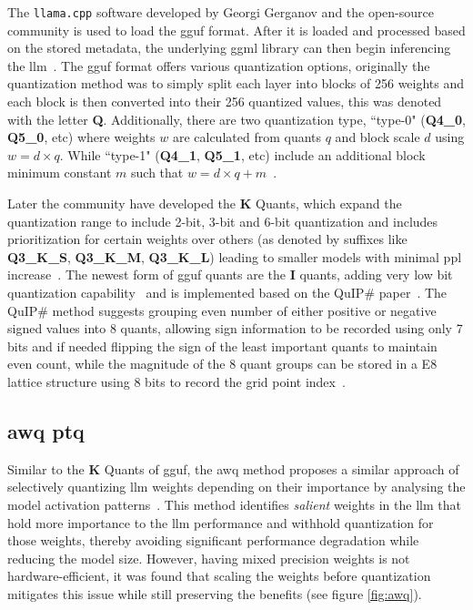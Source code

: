 \documentclass{ifacconf}
\begin{document}
	The \texttt{llama.cpp} software developed by Georgi Gerganov and the open-source community is used to load the \gls{gguf} format. After it is loaded and processed based on the stored metadata, the underlying \gls{ggml} library can then begin inferencing the \gls{llm}~\cite{ggufgithub}. The \gls{gguf} format offers various quantization options, originally the quantization method was to simply split each layer into blocks of 256 weights and each block is then converted into their 256 quantized values, this was denoted with the letter \textbf{Q}. Additionally, there are two quantization type, ``type-0" (\textbf{Q4\_0}, \textbf{Q5\_0}, etc) where weights $w$ are calculated from quants $q$ and block scale $d$ using $w = d \times q$. While ``type-1" (\textbf{Q4\_1}, \textbf{Q5\_1}, etc) include an additional block minimum constant $m$ such that $w = d \times q + m$~\cite{ggufgithubquantdoc, ggufgithubkquantpr}. 
	
	Later the community have developed the \textbf{K} Quants, which expand the quantization range to include 2-bit, 3-bit and 6-bit quantization and includes prioritization for certain weights over others (as denoted by suffixes like \textbf{Q3\_K\_S}, \textbf{Q3\_K\_M}, \textbf{Q3\_K\_L}) leading to smaller models with minimal \gls{ppl} increase~\cite{ggufgithubkquantpr}. The newest form of \gls{gguf} quants are the \textbf{I} quants, adding very low bit quantization capability~\cite{ggufgithubiquantpr} and is implemented based on the QuIP\# paper~\cite{tseng2024quipbetterllmquantization}. The QuIP\# method suggests grouping even number of either positive or negative signed values into 8 quants, allowing sign information to be recorded using only 7 bits and if needed flipping the sign of the least important quants to maintain even count, while the magnitude of the 8 quant groups can be stored in a E8 lattice structure using 8 bits to record the grid point index~\cite{ggufgithubiquantpr}. 
	
	\subsection{\gls{awq} \gls{ptq}}
	
	Similar to the \textbf{K} Quants of \gls{gguf}, the \gls{awq} method proposes a similar approach of selectively quantizing \gls{llm} weights depending on their importance by analysing the model activation patterns~\cite{lin2024awqactivationawareweightquantization}. This method identifies \textit{salient} weights in the \gls{llm} that hold more importance to the \gls{llm} performance and withhold quantization for those weights, thereby avoiding significant performance degradation while reducing the model size. However, having  mixed precision weights is not hardware-efficient, it was found that scaling the weights before quantization mitigates this issue while still preserving the benefits (see figure \ref{fig:awq}).
	
\end{document}
